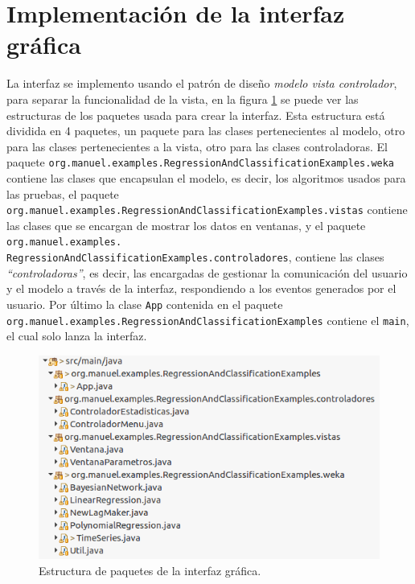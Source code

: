 \section{Implementación de la interfaz gráfica} \label{sec:implementacionInterfazGraf}

La interfaz se implemento usando el patrón de diseño  \textit{modelo vista controlador}, para separar la funcionalidad de la vista, en la figura \ref{fig:estructuraAPI} se puede ver las estructuras de los paquetes usada para crear la interfaz.
Esta estructura está dividida en 4 paquetes, un paquete para las clases pertenecientes al modelo, otro para las clases pertenecientes a la vista, otro para las clases controladoras. El paquete \texttt{org.manuel.examples.RegressionAndClassificationExamples.weka} contiene las clases que encapsulan el modelo, es decir, los algoritmos usados para las pruebas, el paquete \texttt{org.manuel.examples.RegressionAndClassificationExamples.vistas} contiene las clases que se encargan de mostrar los datos en ventanas, y el paquete \texttt{org.manuel.examples. RegressionAndClassificationExamples.controladores}, contiene las clases \textit{``controladoras''}, es decir, las encargadas de gestionar la comunicación del usuario y el modelo a través de la interfaz, respondiendo a los eventos generados por el usuario. Por último la clase \texttt{App} contenida en el paquete \texttt{org.manuel.examples.RegressionAndClassificationExamples} contiene el \texttt{main}, el cual solo lanza la interfaz. 

\begin{figure}[ht]%
	\centering
	\includegraphics[width=15cm]{img/paquetesInterfaz.png}
	\caption{Estructura de paquetes de la interfaz gráfica.}
	\label{fig:estructuraAPI}
\end{figure}

